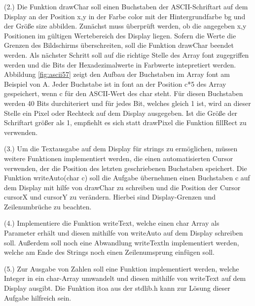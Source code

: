 (2.) Die Funktion drawChar soll einen Buchstaben der ASCII-Schriftart auf dem Display an der Position x,y in der Farbe color mit der Hintergrundfarbe bg und der Größe size abbilden. Zunächst muss überprüft werden, ob die angegeben x,y Positionen im gültigen Wertebereich des Display liegen. Sofern die Werte die Grenzen des Bildschirms überschreiten, soll die Funktion drawChar beendet werden. Als nächster Schritt soll auf die richtige Stelle des Array font zugegriffen werden und die Bits der Hexadezimalwerte in Farbwerte intepretiert werden. Abbildung \ref{fig:ascii57} zeigt den Aufbau der Buchstaben im Array font am Beispiel von A. Jeder Buchstabe ist in font an der Position c*5 des Array gespeichert, wenn c für den ASCII-Wert des char steht. Für diesen Buchstaben werden 40 Bits durchiteriert und für jedes Bit, welches gleich 1 ist, wird an dieser Stelle ein Pixel oder Rechteck auf dem Display ausgegeben. Ist die Größe der Schriftart größer als 1, empfiehlt es sich statt drawPixel die Funktion fillRect zu verwenden. 

(3.) Um die Textausgabe auf dem Display für strings zu ermöglichen, müssen weitere Funktionen implementiert werden, die einen automatisierten Cursor verwenden, der die Position des letzten geschriebenen Buchstaben speichert. Die Funktion writeAuto(char c) soll die Aufgabe übernehmen einen Buchstaben c auf dem Display mit hilfe von drawChar zu schreiben und die Position der Cursor cursorX und cursorY zu verändern. Hierbei sind Display-Grenzen und Zeilenumbrüche zu beachten.

(4.) Implementiere die Funktion writeText, welche einen char Array als Parameter erhält und diesen mithilfe von writeAuto auf dem Display schreiben soll. Außerdem soll noch eine Abwandlung writeTextln implementiert werden, welche am Ende des Strings noch einen Zeilenumsprung einfügen soll.

(5.) Zur Ausgabe von Zahlen soll eine Funktion implementiert werden, welche Integer in ein char-Array umwandelt und diesen mithilfe von writeText auf dem Display ausgibt. Die Funktion itoa aus der stdlib.h kann zur Lösung dieser Aufgabe hilfreich sein.
